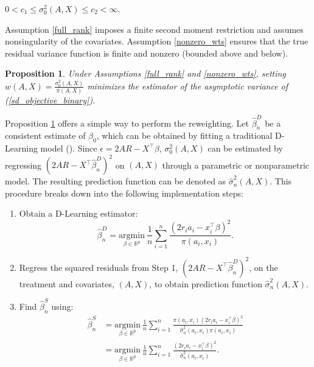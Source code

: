 \documentclass[useAMS,usenatbib]{biom}
\newtheorem{proposition}{Proposition} %
\begin{document}
\begin{assumption} \label{nonzero_wts}
$0 < c_1 \leq \sigma_0^2(A,X) \leq c_2 < \infty$.
\end{assumption}

Assumption \ref{full_rank} imposes a finite second moment restriction and assumes nonsingularity of the covariates. Assumption \ref{nonzero_wts} ensures that the true residual variance function is finite and nonzero (bounded above and below). 

\begin{proposition} \label{weights_prop_binary}
Under Assumptions \ref{full_rank} and \ref{nonzero_wts}, setting $w(A,X) = \frac{\sigma_0^2(A,X)}{\pi(A,X)}$ minimizes the estimator of the asymptotic variance of (\ref{sd_objective_binary}).
\end{proposition}

Proposition \ref{weights_prop_binary} offers a simple way to perform the reweighting. Let $\hat{\beta}_n^D$ be a consistent estimate of $\beta_0$, which can be obtained by fitting a traditional D-Learning model (\cite{qi_d-learning_2018}). Since $\epsilon = 2AR - X^{\top} \beta$, $\sigma_0^2(A,X)$ can be estimated by regressing $\left(2AR - X^{\top}\hat{\beta}_n^D\right)^2$ on $(A,X)$ through a parametric or nonparametric model. The resulting prediction function can be denoted as $\hat{\sigma}_n^2(A,X)$. This procedure breaks down into the following implementation steps:
\begin{enumerate}
    \item Obtain a D-Learning estimator:
    \begin{equation*}
        \hat{\beta}_n^D = \underset{\beta \in \mathbb{R}^{p}}{\mathrm{argmin}}\ \frac{1}{n} \sum_{i=1}^n \frac{\left(2 r_i a_i - x_i^{\top}\beta\right)^2}{\pi(a_i, x_i)}.
    \end{equation*}
    \item Regress the squared residuals from Step 1, $\left(2AR - X^{\top}\hat{\beta}_n^D \right)^2$, on the treatment and covariates, $(A,X)$, to obtain prediction function $\hat{\sigma}_n^2(A,X)$.
    \item Find $\hat{\beta}_n^S$ using:
    \begin{equation} \label{beta_sdlearning_binary}
    \begin{split}
    \hat{\beta}_n^S &= \underset{\beta \in \mathbb{R}^{p}}{\mathrm{argmin}}\ \frac{1}{n} \sum_{i=1}^n \frac{\pi \left(a_i,x_i\right) \left(2r_i a_i - x_i^{\top}\beta \right)^2}{\hat{\sigma}_n^2 \left( a_i, x_i \right) \pi \left(a_i,x_i\right)} \\
    &= \underset{\beta \in \mathbb{R}^{p}}{\mathrm{argmin}}\ \frac{1}{n} \sum_{i=1}^n \frac{\left(2r_i a_i - x_i^{\top}\beta\right)^2}{\hat{\sigma}_n^2 \left( a_i, x_i \right)}.
    \end{split}
    \end{equation}
\end{enumerate}
\end{document}

